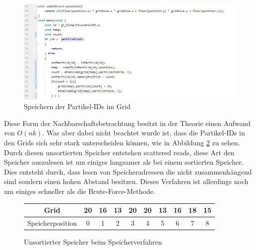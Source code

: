 \documentclass[intern,palatino]{cgBA}
\begin{document}
\begin{figure}[H]
	\centering
	\includegraphics[width=1.3\columnwidth]{Bilder/StoringLable.jpg}
	\caption{Speichern der Partikel-IDs im Grid }
	\label{img:Storinglable}
\end{figure}
\newpage
Diese Form der Nachbarschaftsbetrachtung besitzt in der Theorie einen Aufwand von $O(n k)$. Was aber dabei nicht beachtet wurde ist, dass die Partikel-IDs in den Grids sich sehr stark unterscheiden können, wie in Abbildung \ref{tab:Speicher} zu sehen.
\newline
Durch diesen unsortierten Speicher entstehen scattered reads, diese Art den Speicher auszulesen ist um einiges langsamer als bei einem sortierten Speicher. Dies entsteht durch, dass lesen von Speicheradressen die nicht zusammenhängend sind sondern einen hohen Abstand besitzen.
\newline
Dieses Verfahren ist allerdings noch um einiges schneller als die Brute-Force-Methode.

\begin{figure}[H]
	\centering
	\begin{tabular}{ | c || c | c | c | c | c | c | c | c | c |}
		\hline
		Grid 				&  20 & 16 & 13 & 20 & 20 & 13 & 16 & 18 & 15	\\ \hline
		Speicherposition	&   0 &  1 &  2 &  3 &  4 &  5 &  6 &  7 &  8	\\
		\hline
	\end{tabular}
	\caption{Unsortierter Speicher beim Speicherverfahren}
	\label{tab:Speicher}
\end{figure}

\end{document}
